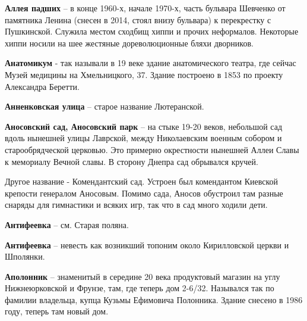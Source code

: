 \medskip

\textbf{Аллея падших} – в конце 1960-х, начале 1970-х, часть бульвара Шевченко от памятника Ленина (снесен в 2014, стоял внизу бульвара) к перекрестку с Пушкинской. Служила местом сходбищ хиппи и прочих неформалов. Некоторые хиппи носили на шее жестяные дореволюционные бляхи дворников.\\

\medskip

\textbf{Анатомикум} - так называли в 19 веке здание анатомического театра, где сейчас Музей медицины на Хмельницкого, 37. Здание построено в 1853 по проекту Александра Беретти.\\

\medskip

\textbf{Анненковская улица} – старое название Лютеранской.\\

\medskip


\textbf{Аносовский сад, Аносовский парк} – на стыке 19-20 веков, небольшой сад вдоль нынешней улицы Лаврской, между Николаевским военным собором и старообрядческой церковью. Это примерно окрестности нынешней Аллеи Славы к мемориалу Вечной славы. В сторону Днепра сад обрывался кручей.

Другое название - Комендантский сад. Устроен был комендантом Киевской крепости генералом Аносовым. Помимо сада, Аносов обустроил там разные снаряды для гимнастики и всяких игр, так что в сад много ходили дети.\\ 

\medskip


\textbf{Антифеевка} – см. Старая поляна.\\

\medskip


\textbf{Антифеевка} – невесть как возникший топоним около Кирилловской церкви и Шполянки.\\

\medskip



\textbf{Аполонник} – знаменитый в середине 20 века продуктовый магазин на углу Нижнеюрковской и Фрунзе, там, где теперь дом 2-6/32. Назывался так по фамилии владельца, купца Кузьмы Ефимовича Полонника. Здание снесено в 1986 году, теперь там новый дом.\\

